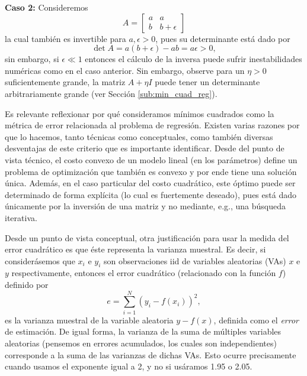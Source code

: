 \begin{mdframed}[style=discusion, frametitle={\center ¿Matriz cuasi-singular o incorrectamente escalada?}]
\noindent\textbf{Caso 2:} Consideremos
\begin{equation}
	A = \left[ \begin{matrix} a  & a \\  b  & b + \epsilon\end{matrix}\right]
\end{equation}
la cual también es invertible para $a,\epsilon>0$, pues su determinante está dado por
\begin{equation}
	\det{A} = a(b+\epsilon) - ab = a\epsilon>0,
\end{equation}
sin embargo, si $\epsilon\ll1$ entonces el cálculo de la inversa puede sufrir inestabilidades numéricas como en el caso anterior. Sin embargo, observe para un $\eta>0$ suficientemente grande, la matriz $A+\eta I$ puede tener un determinante arbitrariamente grande (ver Sección \ref{sub:min_cuad_reg}).
\end{mdframed}

Es relevante reflexionar por qué consideramos mínimos cuadrados como la métrica de error relacionada al problema de regresión. Existen varias razones por que lo hacemos, tanto técnicas como conceptuales, como también diversas desventajas de este criterio que es importante identificar.  Desde del punto de vista técnico, el costo convexo de un modelo lineal (en los parámetros) define un problema de optimización que también es convexo y por ende tiene una solución única. Además, en el caso particular del costo cuadrático, este óptimo puede ser determinado de forma explícita (lo cual es fuertemente deseado), pues está dado únicamente por la inversión de una matriz y no mediante, e.g., una búsqueda iterativa.

Desde un punto de vista conceptual, otra justificación para usar la medida del error cuadrático es que éste representa la varianza muestral. Es decir, si considerásemos que $x_i$ e $y_i$ son observaciones iid de variables aleatorias (VAs) $x$ e $y$ respectivamente, entonces el error cuadrático (relacionado con la función $f$) definido por
\begin{equation}
	e= \sum_{i=1}^N (y_i-f(x_i))^2,
\end{equation}
es la varianza muestral de la variable aleatoria $y-f(x)$, definida como el \emph{error} de estimación. De igual forma, la varianza de la suma de múltiples variables aleatorias (pensemos en errores acumulados, los cuales son independientes) corresponde a la suma de las varianzas de dichas VAs. Esto ocurre precisamente cuando usamos el exponente igual a 2, y no si usáramos 1.95 o 2.05. 

